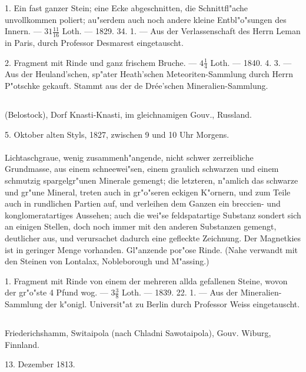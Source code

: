 \documentclass[a4paper, 11pt, oneside, polutonikogreek, german]{article}
\begin{document}
1. Ein fast ganzer Stein; eine Ecke abgeschnitten, die Schnittfl"ache unvollkommen poliert; au"serdem auch noch andere kleine Entbl"o"sungen des Innern. --- $31\frac{11}{16}$ Loth. --- 1829. 34. 1. --- Aus der Verlassenschaft des Herrn Leman in Paris, durch Professor Desmarest eingetauscht.

2. Fragment mit Rinde und ganz frischem Bruche. --- $4\frac{1}{4}$ Loth. --- 1840. 4. 3. --- Aus der Heuland'schen, sp"ater Heath'schen Meteoriten-Sammlung durch Herrn P"otschke gekauft. Stammt aus der de Drée'schen Mineralien-Sammlung.
\subsection{}
\begin{center}

(Belostock), Dorf Knasti-Knasti, im gleichnamigen Gouv., Russland.

5. Oktober alten Styls, 1827, zwischen 9 und 10 Uhr Morgens.
\end{center}
\paragraph{}
Lichtaschgraue, wenig zusammenh"angende, nicht schwer zerreibliche Grundmasse, aus einem schneewei"sen, einem graulich schwarzen und einem schmutzig spargelgr"unen Minerale gemengt; die letzteren, n"amlich das schwarze und gr"une Mineral, treten auch in gr"o"seren eckigen K"ornern, und zum Teile auch in rundlichen Partien auf, und verleihen dem Ganzen ein breccien- und konglomeratartiges Aussehen; auch die wei"se feldspatartige Substanz sondert sich an einigen Stellen, doch noch immer mit den anderen Substanzen gemengt, deutlicher aus, und verursachet dadurch eine gefleckte Zeichnung. Der Magnetkies ist in geringer Menge vorhanden. Gl"anzende por"ose Rinde. (Nahe verwandt mit den Steinen von Lontalax, Nobleborough und M"assing.)

1. Fragment mit Rinde von einem der mehreren allda gefallenen Steine, wovon der gr"o"ste 4 Pfund wog. --- $3\frac{3}{8}$ Loth. --- 1839. 22. 1. --- Aus der Mineralien-Sammlung der k"onigl. Universit"at zu Berlin durch Professor Weiss eingetauscht.
\subsection{}
\begin{center}

Friederichshamm, Switaipola (nach Chladni Sawotaipola), Gouv. Wiburg, Finnland.

13. Dezember 1813.
\end{center}
\end{document}
